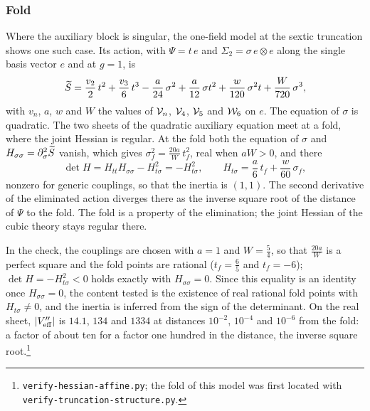 \subsubsection{Fold}
\label{fdm:sec:hessian:fold}

Where the auxiliary block is singular, the one-field model at the sextic truncation shows one such case.
Its action, with $\Psi = t \, e$ and $\Sigma_2 = \sigma \, e \otimes e$ along the single basis vector $e$ and at $g = 1$, is
\begin{equation}
  \label{fdm:eq:fold:action}
  \widetilde{S}_{}
    = \frac{v_2}{2} \, t^2 + \frac{v_3}{6} \, t^3
      - \frac{a}{24} \, \sigma^2 + \frac{a}{12} \, \sigma t^2
      + \frac{w}{120} \, \sigma^2 t + \frac{W}{720} \, \sigma^3,
\end{equation}
with $v_n$, $a$, $w$ and $W$ the values of $\mathcal{V}_{n}$, $\mathcal{V}_{4}$, $\mathcal{V}_{5}$ and $\mathcal{W}_{6}$ on $e$.
The equation of $\sigma$ is quadratic.
The two sheets of the quadratic auxiliary equation meet at a fold, where the joint Hessian is regular.
At the fold both the equation of $\sigma$ and $H_{\sigma \sigma} = \partial_\sigma^2 \widetilde{S}_{}$ vanish, which gives $\sigma_f^2 = \tfrac{20 a}{W} \, t_f^2$, real when $a W > 0$, and there
\begin{equation}
  \label{fdm:eq:fold:det}
  \det H
    = H_{tt} H_{\sigma \sigma} - H_{t \sigma}^2
    = - H_{t \sigma}^2,
  \qquad
  H_{t \sigma}
    = \frac{a}{6} \, t_f + \frac{w}{60} \, \sigma_f,
\end{equation}
nonzero for generic couplings, so that the inertia is $(1, 1)$.
The second derivative of the eliminated action diverges there as the inverse square root of the distance of $\Psi$ to the fold.
The fold is a property of the elimination; the joint Hessian of the cubic theory stays regular there.

In the check, the couplings are chosen with $a = 1$ and $W = \tfrac54$, so that $\tfrac{20 a}{W}$ is a perfect square and the fold points are rational ($t_f = \tfrac65$ and $t_f = -6$); $\det H = - H_{t\sigma}^2 < 0$ holds exactly with $H_{\sigma\sigma} = 0$.
Since this equality is an identity once $H_{\sigma\sigma} = 0$, the content tested is the existence of real rational fold points with $H_{t\sigma} \neq 0$, and the inertia is inferred from the sign of the determinant.
On the real sheet, ${|V_{\mathrm{eff}}''|}$ is $14.1$, $134$ and $1334$ at distances $10^{-2}$, $10^{-4}$ and $10^{-6}$ from the fold: a factor of about ten for a factor one hundred in the distance, the inverse square root.\footnote{\texttt{verify-hessian-affine.py}; the fold of this model was first located with \texttt{verify-truncation-structure.py}.}

